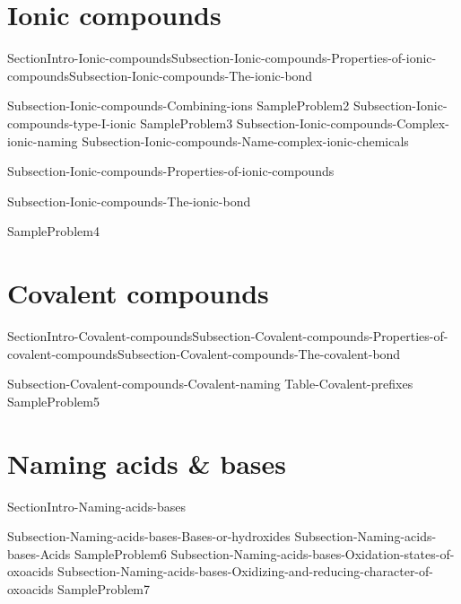 \documentclass[main.tex]{subfiles}
\newcommand\chapterlabel{Ch-naming}\setcounter{figurenewcounter}{0}\setcounter{tablenewcounter}{0}\setcounter{formulanewcounter}{0}\chapterpicture{../{\chapterlabel}/figure1}\chapterpicturelabel{Pixnio}
\begin{document}
\section{Ionic compounds}
{SectionIntro-Ionic-compounds}{Subsection-Ionic-compounds-Properties-of-ionic-compounds}{Subsection-Ionic-compounds-The-ionic-bond}
\sloppy \begin{description}
{Subsection-Ionic-compounds-Combining-ions}
{SampleProblem2}
{Subsection-Ionic-compounds-type-I-ionic}
{SampleProblem3}
{Subsection-Ionic-compounds-Complex-ionic-naming}
{Subsection-Ionic-compounds-Name-complex-ionic-chemicals}


\item[\docfilehook{Properties of ionic compounds}{}]{Subsection-Ionic-compounds-Properties-of-ionic-compounds}
\item[\docfilehook{The ionic bond}{ }]{Subsection-Ionic-compounds-The-ionic-bond}
\end{description}
{SampleProblem4}
\section{Covalent compounds}
{SectionIntro-Covalent-compounds}{Subsection-Covalent-compounds-Properties-of-covalent-compounds}{Subsection-Covalent-compounds-The-covalent-bond}
\sloppy \begin{description}
{Subsection-Covalent-compounds-Covalent-naming}
 {Table-Covalent-prefixes}	
{SampleProblem5}
\end{description}
\section{Naming acids \& bases}
{SectionIntro-Naming-acids-bases}
\sloppy \begin{description}
{Subsection-Naming-acids-bases-Bases-or-hydroxides}
{Subsection-Naming-acids-bases-Acids}
{SampleProblem6}
{Subsection-Naming-acids-bases-Oxidation-states-of-oxoacids}
{Subsection-Naming-acids-bases-Oxidizing-and-reducing-character-of-oxoacids}
{SampleProblem7}
\end{description}
\end{document}
